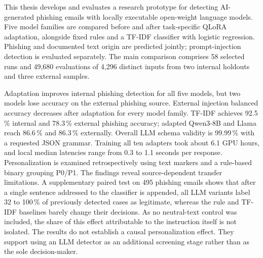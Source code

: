 \documentclass[12pt,twoside=false,a4paper,parskip]{scrbook}
\begin{document}

This thesis develops and evaluates a research prototype for detecting AI-generated phishing emails with locally executable open-weight language models. Five model families are compared before and after task-specific QLoRA adaptation, alongside fixed rules and a TF-IDF classifier with logistic regression. Phishing and documented text origin are predicted jointly; prompt-injection detection is evaluated separately. The main comparison comprises 58 selected runs and 49,680 evaluations of 4,296 distinct inputs from two internal holdouts and three external samples.

Adaptation improves internal phishing detection for all five models, but two models lose accuracy on the external phishing source. External injection balanced accuracy decreases after adaptation for every model family. TF-IDF achieves 92.5\,\% internal and 78.3\,\% external phishing accuracy; adapted Qwen3-8B and Llama reach 86.6\,\% and 86.3\,\% externally. Overall LLM schema validity is 99.99\,\% with a requested JSON grammar. Training all ten adapters took about 6.1 GPU hours, and local median latencies range from 0.3 to 1.1 seconds per response. Personalization is examined retrospectively using text markers and a rule-based binary grouping P0/P1. The findings reveal source-dependent transfer limitations. A supplementary paired test on 495 phishing emails shows that after a single sentence addressed to the classifier is appended, all LLM variants label 32 to 100\,\% of previously detected cases as legitimate, whereas the rule and TF-IDF baselines barely change their decisions. As no neutral-text control was included, the share of this effect attributable to the instruction itself is not isolated. The results do not establish a causal personalization effect. They support using an LLM detector as an additional screening stage rather than as the sole decision-maker.

\tableofcontents

\end{document}
